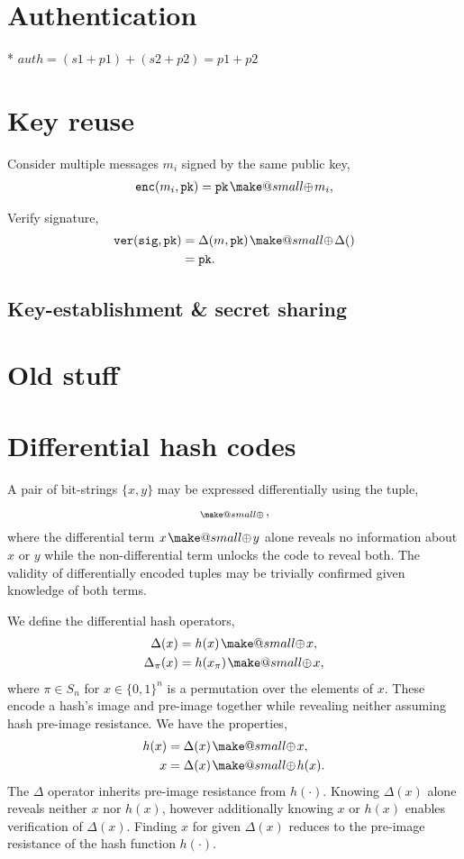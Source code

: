 \documentclass[twocolumn, aps, amsmath, amssymb, nofootinbib, superscriptaddress, longbibliography, doublefloatfix, table-of-contents, eqsecnum, rmp]{revtex4-2}
\makeatletter
\def\pk{\mathtt{pk}}
\def\sig{\mathtt{sig}}
\def\ver{\mathtt{ver}}
\def\enc{\mathtt{enc}}
\newcommand{\soplus}{{{\hspace{1pt}}{\mathbin{\mathpalette\make@small{\mathbin\oplus}}}}{\hspace{1pt}}}
\newcommand{\make@small}[2]{%
  \vcenter{\hbox{%
    \scalebox{0.6}{$\m@th#1#2$}%
  }}%
}
\makeatother
\begin{document}
\section{Authentication}

* $auth = (s1+p1)+(s2+p2) = p1+p2$

\section{Key reuse}

Consider multiple messages $m_i$ signed by the same public key,
\begin{align}
	\enc(m_i,\pk) &= \pk \soplus m_i, \nonumber\\
\end{align}

Verify signature,
\begin{align}
	\ver(\sig,\pk) &= \Delta(m,\pk) \soplus \Delta() \nonumber\\
	&= \pk.
\end{align}

\subsection{Key-establishment \& secret sharing}

\section{Old stuff}

\section{Differential hash codes}

A pair of bit-strings $\{x,y\}$ may be expressed differentially using the tuple,
\begin{align}
	[x,x\soplus y]_\soplus,
\end{align}
where the differential term $x\soplus y$ alone reveals no information about $x$ or $y$ while the non-differential term unlocks the code to reveal both. The validity of differentially encoded tuples may be trivially confirmed given knowledge of both terms.

We define the differential hash operators,
\begin{align}
	\Delta(x) &= h(x)\soplus x,\nonumber\\
	\Delta_\pi(x) &= h(x_\pi)\soplus x,
\end{align}
where $\pi\in S_n$ for $x\in\{0,1\}^n$ is a permutation over the elements of $x$. These encode a hash's image and pre-image together while revealing neither assuming hash pre-image resistance. We have the properties,
\begin{align}
	h(x) &= \Delta(x) \soplus x,\nonumber\\
	x &= \Delta(x) \soplus h(x).
\end{align}
The $\Delta$ operator inherits pre-image resistance from $h(\cdot)$. Knowing $\Delta(x)$ alone reveals neither $x$ nor $h(x)$, however additionally knowing $x$ or $h(x)$ enables verification of $\Delta(x)$. Finding $x$ for given $\Delta(x)$ reduces to the pre-image resistance of the hash function $h(\cdot)$.
\end{document}
